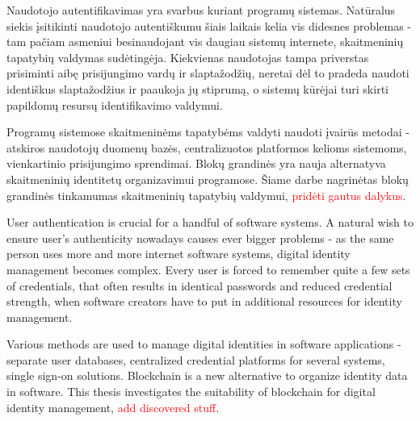 Naudotojo autentifikavimas yra svarbus kuriant programų sistemas. Natūralus siekis
įsitikinti naudotojo autentiškumu šiais laikais kelia vis didesnes problemas - tam pačiam asmeniui besinaudojant
vis daugiau sistemų internete, skaitmeninių tapatybių valdymas sudėtingėja.
Kiekvienas naudotojas tampa priverstas prisiminti aibę prisijungimo
vardų ir slaptažodžių, neretai dėl to pradeda naudoti identiškus slaptažodžius ir paaukoja jų stiprumą, o sistemų kūrėjai turi
skirti papildomų resursų identifikavimo valdymui.


Programų sistemose skaitmeninėms tapatybėms valdyti naudoti įvairūs metodai - atskiros naudotojų duomenų bazės,
centralizuotos platformos kelioms sistemoms, vienkartinio prisijungimo sprendimai. Blokų grandinės yra nauja
alternatyva skaitmeninių identitetų organizavimui programose. Šiame darbe nagrinėtas blokų grandinės
tinkamumas skaitmeninių tapatybių valdymui, \textcolor{red}{pridėti gautus dalykus}.



User authentication is crucial for a handful of software systems. A natural wish to
ensure user's authenticity nowadays causes ever bigger problems - as the same person uses more and more internet software systems,
digital identity management becomes complex. Every user is forced to remember quite a few sets of credentials,
that often results in identical passwords and reduced credential strength, when software creators have to put
in additional resources for identity management.

Various methods are used to manage digital identities in software applications - separate user databases,
centralized credential platforms for several systems, single sign-on solutions. Blockchain is a new
alternative to organize identity data in software. This thesis investigates the suitability of blockchain
for digital identity management, \textcolor{red}{add discovered stuff}.
